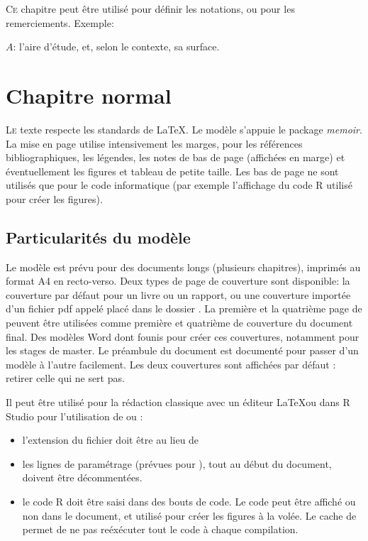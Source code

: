 \documentclass[
  a4paper, %
  11pt, extrafontsizes, %
  onecolumn, %
  openright, %
]{memoir}
\begin{document}
\lettrine{C}{e} chapitre peut être utilisé pour définir les notations, ou pour les remerciements. Exemple:

\noindent $A$: l'aire d'étude, et, selon le contexte, sa surface.



\mainmatter
\LargeMargins                   %



\chapter{Chapitre normal}

\lettrine{L}{e} texte respecte les standards de \LaTeX. 
Le modèle s'appuie le package \emph{memoir}. 
La mise en page utilise intensivement les marges, pour les références bibliographiques, les légendes, les notes de bas de page (affichées en marge) et éventuellement les figures et tableau de petite taille. 
Les bas de page ne sont utilisés que pour le code informatique (par exemple l'affichage du code R utilisé pour créer les figures).


\section{Particularités du modèle}

Le modèle est prévu pour des documents longs (plusieurs chapitres), imprimés au format A4 en recto-verso.
Deux types de page de couverture sont disponible: la couverture par défaut pour un livre ou un rapport, ou une couverture importée d'un fichier pdf appelé  placé dans le dossier .
La première et la quatrième page de  peuvent être utilisées comme première et quatrième de couverture du document final.
Des modèles Word dont founis pour créer ces couvertures, notamment pour les stages de master.
Le préambule du document est documenté pour passer d'un modèle à l'autre facilement.
Les deux couvertures sont affichées par défaut : retirer celle qui ne sert pas.

Il peut être utilisé pour la rédaction classique avec un éditeur \LaTeX ou dans R Studio pour l'utilisation de  ou :
\begin{itemize}
  \item l'extension du fichier doit être  au lieu de 
  \item les lignes de paramétrage (prévues pour ), tout au début du document, doivent être décommentées.
  \item le code R doit être saisi dans des bouts de code. Le code peut être affiché ou non dans le document, et utilisé pour créer les figures à la volée. Le cache de  permet de ne pas reéxécuter tout le code à chaque compilation.
\end{itemize}
\end{document}
